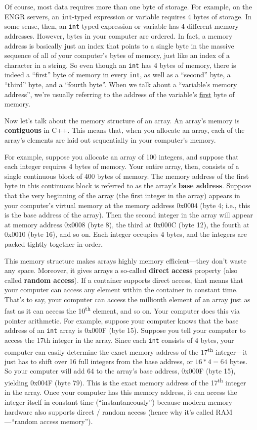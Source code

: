\documentclass{article}
\begin{document}
Of course, most data requires more than one byte of storage. For example, on the ENGR servers, an \texttt{int}-typed expression or variable requires 4 bytes of storage. In some sense, then, an \texttt{int}-typed expression or variable has 4 different memory addresses. However, bytes in your computer are ordered. In fact, a memory address is basically just an index that points to a single byte in the massive sequence of all of your computer's bytes of memory, just like an index of a character in a string. So even though an \texttt{int} has 4 bytes of memory, there is indeed a ``first'' byte of memory in every \texttt{int}, as well as a ``second'' byte, a ``third'' byte, and a ``fourth byte''. When we talk about a ``variable's memory address'', we're usually referring to the address of the variable's \ul{first} byte of memory.

Now let's talk about the memory structure of an array. An array's memory is \textbf{contiguous} in C++. This means that, when you allocate an array, each of the array's elements are laid out sequentially in your computer's memory.

For example, suppose you allocate an array of 100 integers, and suppose that each integer requires 4 bytes of memory. Your entire array, then, consists of a single continuous block of 400 bytes of memory. The memory address of the first byte in this continuous block is referred to as the array's \textbf{base address}. Suppose that the very beginning of the array (the first integer in the array) appears in your computer's virtual memory at the memory address 0x0004 (byte 4; i.e., this is the base address of the array). Then the second integer in the array will appear at memory address 0x0008 (byte 8), the third at 0x000C (byte 12), the fourth at 0x0010 (byte 16), and so on. Each integer occupies 4 bytes, and the integers are packed tightly together in-order.

This memory structure makes arrays highly memory efficient---they don't waste any space. Moreover, it gives arrays a so-called \textbf{direct access} property (also called \textbf{random access}). If a container supports direct access, that means that your computer can access any element within the container in constant time. That's to say, your computer can access the millionth element of an array just as fast as it can access the 10\textsuperscript{th} element, and so on. Your computer does this via pointer arithmetic. For example, suppose your computer knows that the base address of an \texttt{int} array is 0x000F (byte 15). Suppose you tell your computer to access the 17th integer in the array. Since each \texttt{int} consists of 4 bytes, your computer can easily determine the exact memory address of the 17\textsuperscript{th} integer---it just has to shift over 16 full integers from the base address, or $16 * 4 = 64$ bytes. So your computer will add 64 to the array's base address, 0x000F (byte 15), yielding 0x004F (byte 79). This is the exact memory address of the 17\textsuperscript{th} integer in the array. Once your computer has this memory address, it can access the integer itself in constant time (``instantaneously'') because modern memory hardware also supports direct / random access (hence why it's called RAM---``random access memory'').
\end{document}
